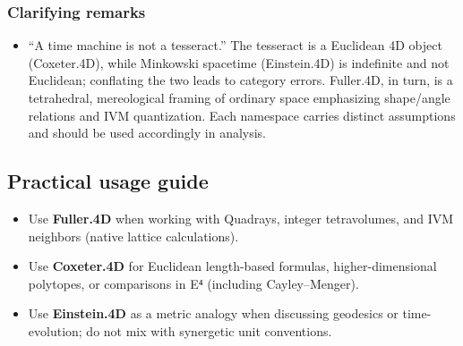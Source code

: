 \documentclass[
  10pt,
]{article}
\providecommand{\tightlist}{%
  \setlength{\itemsep}{0pt}\setlength{\parskip}{0pt}}
\begin{document}
\hypertarget{clarifying-remarks}{%
\subsubsection{Clarifying remarks}\label{clarifying-remarks}}

\begin{itemize}
\tightlist
\item
  ``A time machine is not a tesseract.'' The tesseract is a Euclidean 4D
  object (Coxeter.4D), while Minkowski spacetime (Einstein.4D) is
  indefinite and not Euclidean; conflating the two leads to category
  errors. Fuller.4D, in turn, is a tetrahedral, mereological framing of
  ordinary space emphasizing shape/angle relations and IVM quantization.
  Each namespace carries distinct assumptions and should be used
  accordingly in analysis.
\end{itemize}

\hypertarget{practical-usage-guide}{%
\subsection{Practical usage guide}\label{practical-usage-guide}}

\begin{itemize}
\tightlist
\item
  Use \textbf{Fuller.4D} when working with Quadrays, integer
  tetravolumes, and IVM neighbors (native lattice calculations).
\item
  Use \textbf{Coxeter.4D} for Euclidean length-based formulas,
  higher-dimensional polytopes, or comparisons in E⁴ (including
  Cayley--Menger).
\item
  Use \textbf{Einstein.4D} as a metric analogy when discussing geodesics
  or time-evolution; do not mix with synergetic unit conventions.
\end{itemize}
\end{document}

